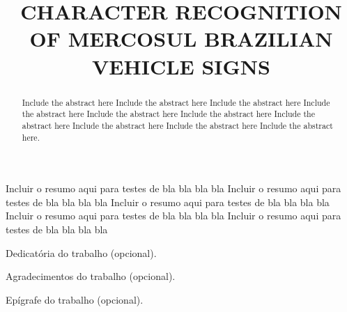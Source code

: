 \documentclass[oneside]{normas-utf-tex} %
\title{\MakeUppercase{Character recognition of Mercosul Brazilian vehicle signs}} %
\begin{document}
\capa %
\folhaderosto %

\termodeaprovacao

\begin{resumo}
Incluir o resumo aqui para testes de bla bla bla bla Incluir o resumo aqui para testes de bla bla bla bla Incluir o resumo aqui para testes de bla bla bla bla Incluir o resumo aqui para testes de bla bla bla bla Incluir o resumo aqui para testes de bla bla bla bla
\end{resumo}

\begin{abstract}
Include the abstract here Include the abstract here Include the abstract here Include the abstract here Include the abstract here Include the abstract here Include the abstract here Include the abstract here Include the abstract here Include the abstract here.
\end{abstract}


\begin{dedicatoria}
Dedicatória do trabalho (opcional). 
\end{dedicatoria}

\begin{agradecimentos}
Agradecimentos do trabalho (opcional). 
\end{agradecimentos}
\begin{epigrafe}
Epígrafe do trabalho (opcional). 
\end{epigrafe}


\listadesiglas %

\sumario %


\end{document}
